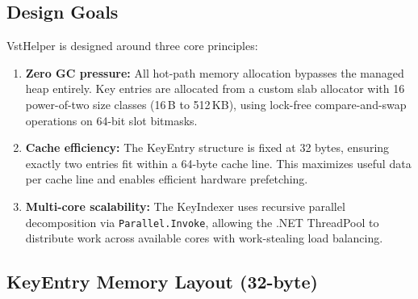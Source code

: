 \documentclass[conference]{IEEEtran}
\begin{document}
\subsection{Design Goals}
\label{sec:design_goals}

VstHelper is designed around three core principles:

\begin{enumerate}[leftmargin=*,nosep]
    \item \textbf{Zero GC pressure:} All hot-path memory allocation bypasses the managed heap entirely. Key entries are allocated from a custom slab allocator with 16 power-of-two size classes (16\,B to 512\,KB), using lock-free compare-and-swap operations on 64-bit slot bitmasks.
    \item \textbf{Cache efficiency:} The KeyEntry structure is fixed at 32 bytes, ensuring exactly two entries fit within a 64-byte cache line. This maximizes useful data per cache line and enables efficient hardware prefetching.
    \item \textbf{Multi-core scalability:} The KeyIndexer uses recursive parallel decomposition via \texttt{Parallel.Invoke}, allowing the .NET ThreadPool to distribute work across available cores with work-stealing load balancing.
\end{enumerate}

\subsection{KeyEntry Memory Layout (32-byte)}
\label{sec:keyentry_layout}
\end{document}
